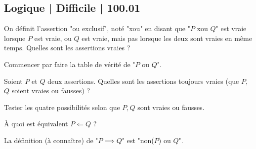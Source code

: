 \subsection{Logique | Difficile | 100.01}


\begin{question}
On définit l'assertion "ou exclusif", noté "xou" en disant que "$P$ xou $Q$" est vraie lorsque $P$ est vraie, ou $Q$ est vraie, mais pas lorsque les deux sont vraies en même temps. Quelles sont les assertions vraies ?
\begin{answers}

    

\end{answers}
\begin{explanations}
Commencer par faire la table de vérité de "$P$ ou $Q$".
\end{explanations}
\end{question}


\begin{question}
Soient $P$ et $Q$ deux assertions. Quelles sont les assertions toujours vraies (que $P$, $Q$ soient vraies ou fausses)  ?
\begin{answers}



\end{answers}
\begin{explanations}
Tester les quatre possibilités selon que $P,Q$ sont vraies ou fausses.
\end{explanations}
\end{question}


\begin{question}
À quoi est équivalent $P \Longleftarrow Q$ ?
\begin{answers}  

      

\end{answers}
\begin{explanations}
La définition (à connaître) de "$P \implies Q$" est "non($P$) ou $Q$".
\end{explanations}
\end{question}


